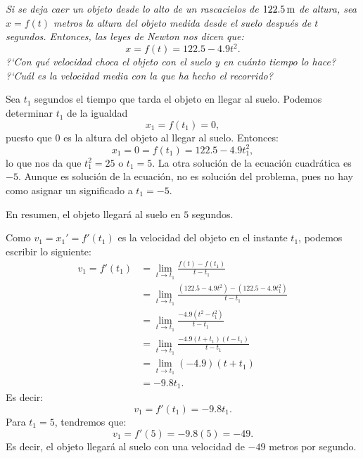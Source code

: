 \begin{exemplo}[]{}
\begingroup
\itshape Si se deja caer un objeto desde lo alto de un rascacielos de $122.5\operatorname{m}$ de altura, sea
$x = f(t)$ metros la altura del objeto medida desde el suelo después de $t$ segundos. Entonces, las
leyes de Newton nos dicen que:
\begin{equation*}
x=f(t) = 122.5-4.9t^2.
\end{equation*}
?`Con qué velocidad choca el objeto con el suelo y en cuánto tiempo lo hace? ?`Cuál es la velocidad
media con la que ha hecho el recorrido?
\endgroup

\vspace{0.5\baselineskip}%
Sea $t_1$ segundos el tiempo que tarda el objeto en llegar al suelo.
Podemos determinar $t_1$ de la igualdad
\begin{equation*}
	x_1=f(t_1) =0,
\end{equation*}
puesto que $0$ es la altura del objeto al llegar al suelo. Entonces:
\begin{equation*}
	x_1=0=f(t_1) = 122.5-4.9t_1^2,
\end{equation*}
lo que nos da que $t_1^2=25$ o $t_1=5$. La otra solución de la ecuación cuadrática es $-5$. Aunque
es solución de la ecuación, no es solución del problema, pues no hay como asignar un significado a
$t_1 = -5$.

En resumen, el objeto llegará al suelo en $5$ segundos.

Como $v_1= x_1'= f'(t_1)$ es la velocidad del objeto en el instante $t_1$, podemos escribir lo
siguiente:
\begin{align*}
v_1=  f'(t_1)&=\lim_{t\to t_1}\frac{f(t)-f(t_1)}{t-t_1}\\
&=\lim_{t\to t_1}\frac{(122.5-4.9t^2)-(122.5-4.9t_1^2)}{t-t_1}\\
&=\lim_{t\to t_1}\frac{-4.9(t^2-t_1^2)}{t-t_1}\\
&=\lim_{t\to t_1}\frac{-4.9(t+t_1)(t-t_1)}{t-t_1}\\
&=\lim_{t\to t_1}(-4.9)(t+t_1)\\
&=-9.8t_1.
\end{align*}
Es decir:
\begin{equation*}
	v_1=  f'(t_1)=-9.8t_1.
\end{equation*}
Para $t_1=5$, tendremos que:
\begin{equation*}
	v_1=  f'(5)=-9.8(5)=-49.
\end{equation*}
Es decir, el objeto llegará al suelo con una velocidad de $-49$ metros por segundo.


\end{exemplo}
